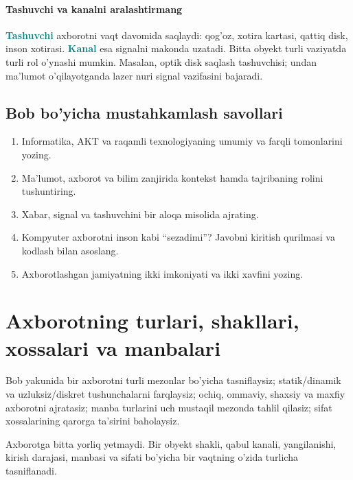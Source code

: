 \documentclass[11pt,a4paper,oneside]{book}
\newcommand{\term}[1]{\textbf{\textcolor{Teal}{#1}}\index{#1}}
\newcommand{\chapterintro}[1]{\begin{tcolorbox}[colback=Navy,coltext=white,arc=2mm,boxrule=0pt]\sffamily #1\end{tcolorbox}}
\begin{document}
\subsubsection{Tashuvchi va kanalni aralashtirmang}
\term{Tashuvchi} axborotni vaqt davomida saqlaydi: qog'oz, xotira kartasi, qattiq disk, inson xotirasi. \term{Kanal} esa signalni makonda uzatadi. Bitta obyekt turli vaziyatda turli rol o'ynashi mumkin. Masalan, optik disk saqlash tashuvchisi; undan ma'lumot o'qilayotganda lazer nuri signal vazifasini bajaradi.
\section{Bob bo'yicha mustahkamlash savollari}
\begin{enumerate}
\item Informatika, AKT va raqamli texnologiyaning umumiy va farqli tomonlarini yozing.
\item Ma'lumot, axborot va bilim zanjirida kontekst hamda tajribaning rolini tushuntiring.
\item Xabar, signal va tashuvchini bir aloqa misolida ajrating.
\item Kompyuter axborotni inson kabi ``sezadimi''? Javobni kiritish qurilmasi va kodlash bilan asoslang.
\item Axborotlashgan jamiyatning ikki imkoniyati va ikki xavfini yozing.
\end{enumerate}

\chapter{Axborotning turlari, shakllari, xossalari va manbalari}

\begin{learningbox}
Bob yakunida bir axborotni turli mezonlar bo'yicha tasniflaysiz; statik/dinamik va uzluksiz/diskret tushunchalarni farqlaysiz; ochiq, ommaviy, shaxsiy va maxfiy axborotni ajratasiz; manba turlarini uch mustaqil mezonda tahlil qilasiz; sifat xossalarining qarorga ta'sirini baholaysiz.
\end{learningbox}
\chapterintro{Axborotga bitta yorliq yetmaydi. Bir obyekt shakli, qabul kanali, yangilanishi, kirish darajasi, manbasi va sifati bo'yicha bir vaqtning o'zida turlicha tasniflanadi.}
\end{document}
